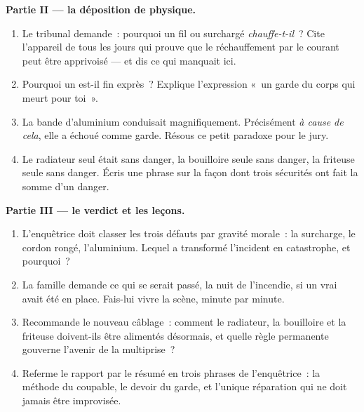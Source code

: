 \begin{problem}
\medskip\noindent\textbf{Partie II --- la déposition de physique.}
\begin{enumerate}[resume]
  \item Le tribunal demande~: pourquoi un fil  ou
        surchargé \emph{chauffe-t-il}~? Cite l'appareil de tous les
        jours qui prouve que le réchauffement par le courant peut
        être apprivoisé --- et dis ce qui manquait ici.
  \item Pourquoi un  est-il fin exprès~? Explique
        l'expression «~un garde du corps qui meurt pour toi~».
  \item La bande d'aluminium conduisait magnifiquement.
        Précisément \emph{à cause de cela}, elle a échoué comme
        garde. Résous ce petit paradoxe pour le jury.
  \item Le radiateur seul était sans danger, la bouilloire seule
        sans danger, la friteuse seule sans danger. Écris une phrase
        sur la façon dont trois sécurités ont fait la somme d'un
        danger.
\end{enumerate}

\medskip\noindent\textbf{Partie III --- le verdict et les leçons.}
\begin{enumerate}[resume]
  \item L'enquêtrice doit classer les trois défauts par gravité
        morale~: la surcharge, le cordon rongé, l'aluminium. Lequel
        a transformé l'incident en catastrophe, et pourquoi~?
  \item La famille demande ce qui se serait passé, la nuit de
        l'incendie, si un vrai  avait été en place. Fais-lui
        vivre la scène, minute par minute.
  \item Recommande le nouveau câblage~: comment le radiateur, la
        bouilloire et la friteuse doivent-ils être alimentés
        désormais, et quelle règle permanente gouverne l'avenir de
        la multiprise~?
  \item Referme le rapport par le résumé en trois phrases de
        l'enquêtrice~: la méthode du coupable, le devoir du garde,
        et l'unique réparation qui ne doit jamais être improvisée.
\end{enumerate}
\end{problem}

